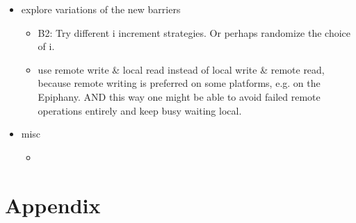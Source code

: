 \documentclass[a4paper, 10pt]{article}
\begin{document}
\begin{itemize}
\begin{itemize}
		\end{itemize}
	\item explore variations of the new barriers
		\begin{itemize}
			\item B2: Try different i increment strategies. Or perhaps randomize the choice of i.
			\item use remote write \& local read instead of local write \& remote read, because remote writing is preferred on some platforms, e.g. on the Epiphany\cite{epiphany}. AND this way one might be able to avoid failed remote operations entirely and keep busy waiting local.
		\end{itemize}
	\item misc
		\begin{itemize}
			\item~
		\end{itemize}
\end{itemize}


\appendix

\pagebreak
\section{Appendix}
\label{sec:appendix}
\end{document}
